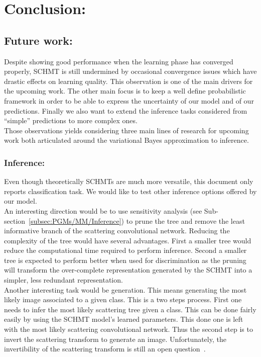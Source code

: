 \documentclass[a4paper,11pt]{report}
\begin{document}
\chapter{Conclusion:}
  \label{chap:ccl}

  \section{Future work:}
  
  Despite showing good performance when the learning phase has converged properly, SCHMT is still undermined by occasional convergence issues which have drastic effects on learning quality. This observation is one of the main drivers for the upcoming work. The other main focus is to keep a well define probabilistic framework in order to be able to express the uncertainty of our model and of our predictions. Finally we also want to extend the inference tasks considered from ``simple'' predictions to more complex ones.\\
  
  Those observations yields considering three main lines of research for upcoming work both articulated around the variational Bayes approximation to inference.\\

  \subsection{Inference:}
  
    Even though theoretically SCHMTs are much more versatile, this document only reports classification task. We would like to test other inference options offered by our model.\\
  
    An interesting direction would be to use sensitivity analysis (see Sub-section~\ref{subsec:PGMs/MM/Inference}) to prune the tree and remove the least informative branch of the scattering convolutional network. Reducing the complexity of the tree would have several advantages. First a smaller tree would reduce the computational time required to perform inference. Second a smaller tree is expected to perform better when used for discrimination as the pruning will transform the over-complete representation generated by the SCHMT into a simpler, less redundant representation.\\
		  
    Another interesting task would be generation. This means generating the most likely image associated to a given class. This is a two steps process. First one needs to infer the most likely scattering tree given a class. This can be done fairly easily by using the SCHMT model's learned parameters. This done one is left with the most likely scattering convolutional network. Thus the second step is to invert the scattering transform to generate an image. Unfortunately, the invertibility of the scattering transform is still an open question~\citep{cheng2015deep}.\\
		  
\end{document}
